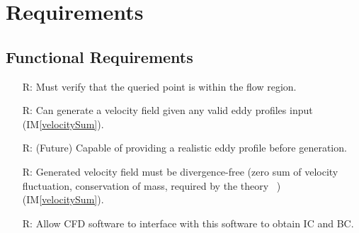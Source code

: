 \documentclass[12pt]{article}
\newcommand{\iref}[1]{IM\ref{#1}}
\newcounter{reqnum} %
\begin{document}
\section{Requirements}



\subsection{Functional Requirements}

\noindent \begin{itemize}

\item[R\refstepcounter{reqnum}\thereqnum \label{R_inputs}:] Must verify that the queried point is within the flow region.


\item[R\refstepcounter{reqnum}\thereqnum \label{R_anyEddy}:] Can generate a velocity field given any valid eddy profiles input (\iref{velocitySum}).
\item[R\refstepcounter{reqnum}\thereqnum \label{R_realEddy}:] (Future) Capable of providing a realistic eddy profile before generation.

\item[R\refstepcounter{reqnum}\thereqnum \label{R_zeroSum}:] Generated velocity field must be divergence-free (zero sum of velocity fluctuation, conservation of mass, required by the theory ~\citet{PolettoEtAl2013}) (\iref{velocitySum}).

\item[R\refstepcounter{reqnum}\thereqnum \label{R_CFD}:] Allow CFD software to interface with this software to obtain IC and BC.


\end{itemize}
\end{document}
